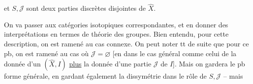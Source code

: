 et $S,\mathcal J$ sont deux parties discrètes disjointes de $\widehat X$.

On va  passer aux catégories isotopiques correspondantes, et en donner des interprétations en termes de théorie des groupes. Bien entendu, pour cette description, on est ramené au cas connexe. On peut  noter tt de suite que pour ce pb, on est ramené au cas où $\mathcal J=\varnothing$ [en  dans le cas général comme celui de la donnée d'un $(\widehat X,I)$ \uline{plus} la donnée d'une partie $\mathcal J$ de $I$]. Mais on gardera le pb   forme générale, en gardant également la dissymétrie dans le rôle de $S,\mathcal J$ -- mais
